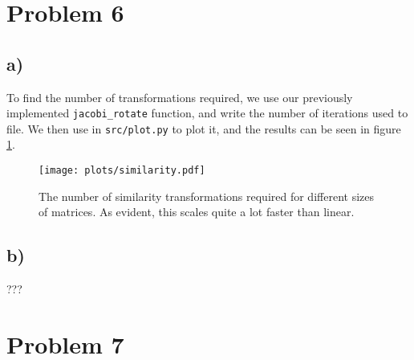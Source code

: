 \documentclass[english,notitlepage]{revtex4-1}  %
\begin{document}
\section*{Problem 6}
\subsection*{a)}
To find the number of transformations required, we use our previously implemented \lstinline{jacobi_rotate} function, and write the number of iterations used to file. We then use in \lstinline{src/plot.py} to plot it, and the results can be seen in figure \ref{fig:similarity}.
\begin{figure}
    \centering
    \texttt{[image: plots/similarity.pdf]}
    \caption{The number of similarity transformations required for different sizes of matrices. As evident, this scales quite a lot faster than linear.}
    \label{fig:similarity}
\end{figure}

\subsection*{b)}
???


\section*{Problem 7}





\end{document}
